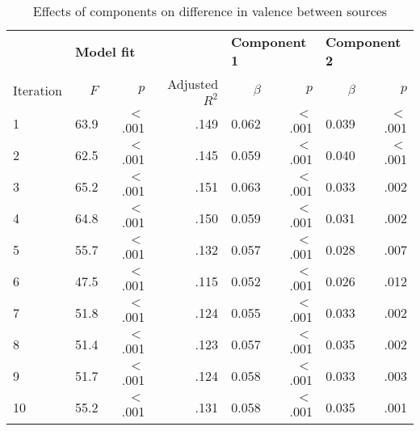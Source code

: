 \begin{table}[ht]
\centering
\small

\begin{threeparttable}
\caption{Effects of components on difference in valence between sources}
\label{tab:val-8}

\begin{tabular*}{\textwidth}{@{\extracolsep{\fill}}lrrrrrrr@{}}

\toprule & 
\multicolumn{3}{l}{\textbf{Model fit}} & \multicolumn{2}{l}{\textbf{Component 1}} & \multicolumn{2}{l}{\textbf{Component 2}} \\
\cmidrule{2-8}

Iteration & $F$  & $p$      & Adjusted $R^2$ & $\beta$ & $p$      & $\beta$ & $p$      \\
\midrule

1         & 63.9 & $<$ .001 & .149           & 0.062   & $<$ .001 & 0.039   & $<$ .001 \\
2         & 62.5 & $<$ .001 & .145           & 0.059   & $<$ .001 & 0.040   & $<$ .001 \\
3         & 65.2 & $<$ .001 & .151           & 0.063   & $<$ .001 & 0.033   & .002     \\
4         & 64.8 & $<$ .001 & .150           & 0.059   & $<$ .001 & 0.031   & .002     \\
5         & 55.7 & $<$ .001 & .132           & 0.057   & $<$ .001 & 0.028   & .007     \\
6         & 47.5 & $<$ .001 & .115           & 0.052   & $<$ .001 & 0.026   & .012     \\
7         & 51.8 & $<$ .001 & .124           & 0.055   & $<$ .001 & 0.033   & .002     \\
8         & 51.4 & $<$ .001 & .123           & 0.057   & $<$ .001 & 0.035   & .002     \\
9         & 51.7 & $<$ .001 & .124           & 0.058   & $<$ .001 & 0.033   & .003     \\
10        & 55.2 & $<$ .001 & .131           & 0.058   & $<$ .001 & 0.035   & .001     \\
\bottomrule

\end{tabular*}
\end{threeparttable}
\end{table}